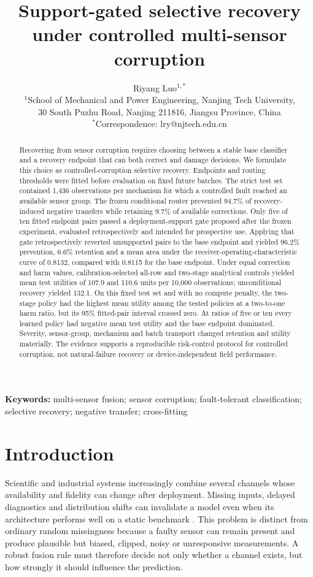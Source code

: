 \documentclass[11pt]{article}
\title{Support-gated selective recovery under controlled multi-sensor corruption}
\author{Riyang Luo$^{1,*}$\\
\small $^1$School of Mechanical and Power Engineering, Nanjing Tech University,\\
\small 30 South Puzhu Road, Nanjing 211816, Jiangsu Province, China\\
\small $^*$Correspondence: lry@njtech.edu.cn}
\date{}
\begin{document}
\maketitle

\begin{abstract}
Recovering from sensor corruption requires choosing between a stable base classifier and a recovery endpoint that can both correct and damage decisions. We formulate this choice as controlled-corruption selective recovery. Endpoints and routing thresholds were fitted before evaluation on fixed future batches. The strict test set contained 1,436 observations per mechanism for which a controlled fault reached an available sensor group. The frozen conditional router prevented 94.7\% of recovery-induced negative transfers while retaining 9.7\% of available corrections. Only five of ten fitted endpoint pairs passed a deployment-support gate proposed after the frozen experiment, evaluated retrospectively and intended for prospective use. Applying that gate retrospectively reverted unsupported pairs to the base endpoint and yielded 96.2\% prevention, 6.6\% retention and a mean area under the receiver-operating-characteristic curve of 0.8132, compared with 0.8115 for the base endpoint. Under equal correction and harm values, calibration-selected all-row and two-stage analytical controls yielded mean test utilities of 107.9 and 110.6 units per 10,000 observations; unconditional recovery yielded 132.1. On this fixed test set and with no compute penalty, the two-stage policy had the highest mean utility among the tested policies at a two-to-one harm ratio, but its 95\% fitted-pair interval crossed zero. At ratios of five or ten every learned policy had negative mean test utility and the base endpoint dominated. Severity, sensor-group, mechanism and batch transport changed retention and utility materially. The evidence supports a reproducible risk-control protocol for controlled corruption, not natural-failure recovery or device-independent field performance.
\end{abstract}

\noindent\textbf{Keywords:} multi-sensor fusion; sensor corruption; fault-tolerant classification; selective recovery; negative transfer; cross-fitting

\section{Introduction}

Scientific and industrial systems increasingly combine several channels whose availability and fidelity can change after deployment. Missing inputs, delayed diagnostics and distribution shifts can invalidate a model even when its architecture performs well on a static benchmark \citep{liu2025deployment,chakraborti2025personalized,mitra2023structured,wu2026survey}. This problem is distinct from ordinary random missingness because a faulty sensor can remain present and produce plausible but biased, clipped, noisy or unresponsive measurements. A robust fusion rule must therefore decide not only whether a channel exists, but how strongly it should influence the prediction.
\end{document}
